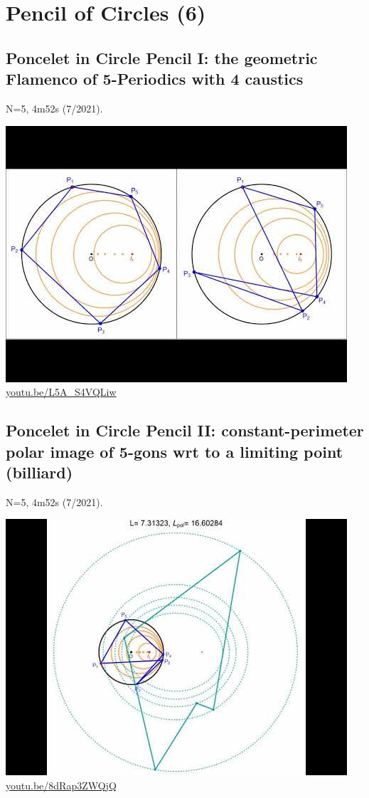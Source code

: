 \documentclass[12pt]{amsart}
\begin{document}
\section{Pencil of Circles (6)}

\subsection{Poncelet in Circle Pencil I: the geometric Flamenco of 5-Periodics with 4 caustics}
\label{vid:L5A_S4VQLiw}
\noindent N=5, 4m52s (7/2021). 
\begin{center}\includegraphics[width=.5\textwidth]{pics/L5A_S4VQLiw.jpg} \\ 
\href{https://youtu.be/L5A_S4VQLiw}{\url{youtu.be/L5A\_S4VQLiw}}\end{center}
% 
\subsection{Poncelet in Circle Pencil II: constant-perimeter polar image of 5-gons wrt to a limiting point (billiard)}
\label{vid:8dRap3ZWQjQ}
\noindent N=5, 4m52s (7/2021). 
\begin{center}\includegraphics[width=.5\textwidth]{pics/8dRap3ZWQjQ.jpg} \\ 
\href{https://youtu.be/8dRap3ZWQjQ}{\url{youtu.be/8dRap3ZWQjQ}}\end{center}
% 
\end{document}
